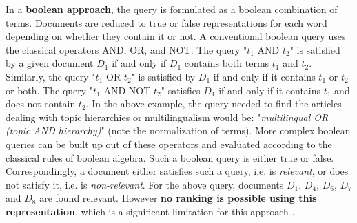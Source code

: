 In a \textbf{boolean approach}, the query is formulated as a boolean combination of terms. Documents are reduced to true or false representations for each word depending on whether they contain it or not. A conventional boolean query uses the classical operators AND, OR, and NOT. The query "$t_1$ AND $t_2$" is satisfied by a given document $D_1$ if and only if $D_1$ contains both terms $t_1$ and $t_2$. Similarly, the query "$t_1$ OR $t_2$" is satisfied by $D_1$ if and only if it contains $t_1$ or $t_2$ or both. The query "$t_1$ AND NOT $t_2$" satisfies $D_1$ if and only if it contains $t_1$ and does not contain $t_2$. In the above example, the query needed to find the articles dealing with topic hierarchies or multilingualism would be: "\textit{multilingual OR (topic AND hierarchy)}" (note the normalization of terms). More complex boolean queries can be built up out of these operators and evaluated according to the classical rules of boolean algebra. Such a boolean query is either true or false. Correspondingly, a document either satisfies such a query, i.e. is \textit{relevant}, or does not satisfy it, i.e. is \textit{non-relevant}. For the above query, documents $D_1$, $D_4$, $D_6$, $D_7$ and $D_8$ are found relevant. However \textbf{no ranking is possible using this representation}, which is a significant limitation for this approach \citep{harmon1995}. 

